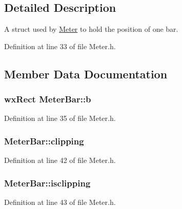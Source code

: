 \subsection{Detailed Description}
A struct used by \hyperlink{class_meter}{Meter} to hold the position of one bar. 

Definition at line 33 of file Meter.\+h.



\subsection{Member Data Documentation}
\subsubsection[{\texorpdfstring{b}{b}}]{\setlength{\rightskip}{0pt plus 5cm}wx\+Rect Meter\+Bar\+::b}\hypertarget{struct_meter_bar_aaa66ea8fc3b5290ab41b7490dce5bbc3}{}\label{struct_meter_bar_aaa66ea8fc3b5290ab41b7490dce5bbc3}


Definition at line 35 of file Meter.\+h.

\subsubsection[{\texorpdfstring{clipping}{clipping}}]{ Meter\+Bar\+::clipping}\hypertarget{struct_meter_bar_aad87b78a5556c0d9eb16855c5025164b}{}\label{struct_meter_bar_aad87b78a5556c0d9eb16855c5025164b}


Definition at line 42 of file Meter.\+h.

\subsubsection[{\texorpdfstring{isclipping}{isclipping}}]{ Meter\+Bar\+::isclipping}\hypertarget{struct_meter_bar_a26612b507724e134343daa4d2eb238f0}{}\label{struct_meter_bar_a26612b507724e134343daa4d2eb238f0}


Definition at line 43 of file Meter.\+h.

